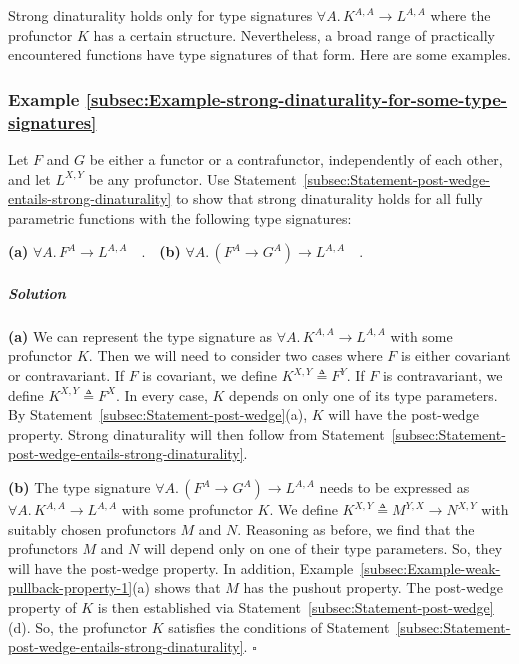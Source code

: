 Strong dinaturality holds only for type signatures $\forall A.\,K^{A,A}\rightarrow L^{A,A}$
where the profunctor $K$ has a certain structure. Nevertheless, a
broad range of practically encountered functions have type signatures
of that form. Here are some examples.

\subsubsection{Example \label{subsec:Example-strong-dinaturality-for-some-type-signatures}\ref{subsec:Example-strong-dinaturality-for-some-type-signatures}}

Let $F$ and $G$ be either a functor or a contrafunctor, independently
of each other, and let $L^{X,Y}$ be any profunctor. Use Statement~\ref{subsec:Statement-post-wedge-entails-strong-dinaturality}
to show that strong dinaturality holds for all fully parametric functions
with the following type signatures:

\textbf{(a)} $\forall A.\,F^{A}\rightarrow L^{A,A}\quad.$\textbf{$\quad$(b)}
$\forall A.\,(F^{A}\rightarrow G^{A})\rightarrow L^{A,A}\quad.$

\subparagraph{Solution}

\textbf{(a)} We can represent the type signature as $\forall A.\,K^{A,A}\rightarrow L^{A,A}$
with some profunctor $K$. Then we will need to consider two cases
where $F$ is either covariant or contravariant. If $F$ is covariant,
we define $K^{X,Y}\triangleq F^{Y}$. If $F$ is contravariant, we
define $K^{X,Y}\triangleq F^{X}$. In every case, $K$ depends on
only one of its type parameters. By Statement~\ref{subsec:Statement-post-wedge}(a),
$K$ will have the post-wedge property. Strong dinaturality will then
follow from Statement~\ref{subsec:Statement-post-wedge-entails-strong-dinaturality}.

\textbf{(b)} The type signature $\forall A.\,(F^{A}\rightarrow G^{A})\rightarrow L^{A,A}$
needs to be expressed as $\forall A.\,K^{A,A}\rightarrow L^{A,A}$
with some profunctor $K$. We define $K^{X,Y}\triangleq M^{Y,X}\rightarrow N^{X,Y}$
with suitably chosen profunctors $M$ and $N$. Reasoning as before,
we find that the profunctors $M$ and $N$ will depend only on one
of their type parameters. So, they will have the post-wedge property.
In addition, Example~\ref{subsec:Example-weak-pullback-property-1}(a)
shows that $M$ has the pushout property. The post-wedge property
of $K$ is then established via Statement~\ref{subsec:Statement-post-wedge}(d).
So, the profunctor $K$ satisfies the conditions of Statement~\ref{subsec:Statement-post-wedge-entails-strong-dinaturality}.
$\square$

